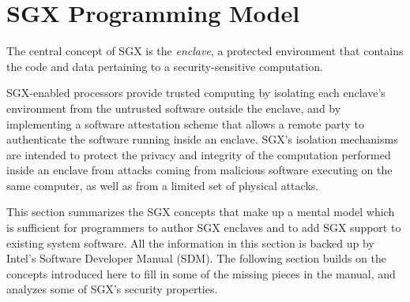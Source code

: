 \section{SGX Programming Model}
\label{sec:sgx_model}

The central concept of SGX is the \textit{enclave}, a protected environment
that contains the code and data pertaining to a security-sensitive computation.

SGX-enabled processors provide trusted computing by isolating each enclave's
environment from the untrusted software outside the enclave, and by
implementing a software attestation scheme that allows a remote party to
authenticate the software running inside an enclave. SGX's isolation mechanisms
are intended to protect the privacy and integrity of the computation performed
inside an enclave from attacks coming from malicious software executing on the
same computer, as well as from a limited set of physical attacks.

This section summarizes the SGX concepts that make up a mental model which is
sufficient for programmers to author SGX enclaves and to add SGX support to
existing system software. All the information in this section is backed up by
Intel's Software Developer Manual (SDM). The following section builds on the
concepts introduced here to fill in some of the missing pieces in the manual,
and analyzes some of SGX's security properties.









